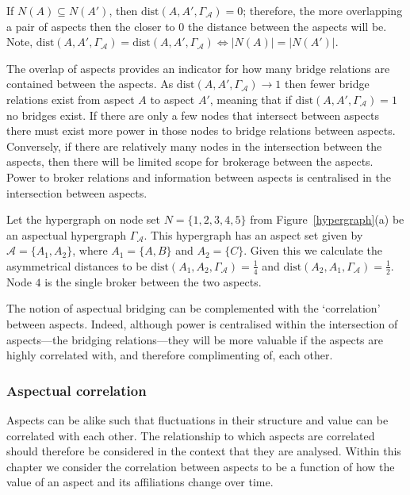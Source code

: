 If $N(A) \subseteq N(A')$, then $\mbox{dist}(A, A', \Gamma_{\mathcal{A}}) = 0$; therefore, the more overlapping a pair of aspects then the closer to $0$ the distance between the aspects will be. Note, $\mbox{dist}(A, A',\Gamma_{\mathcal{A}}) = \mbox{dist}(A, A',\Gamma_{\mathcal{A}}) \iff | N(A) | = | N(A') |$.

The overlap of aspects provides an indicator for how many bridge relations are contained between the aspects. As $\mbox{dist}(A, A',\Gamma_{\mathcal{A}}) \rightarrow 1$ then fewer bridge relations exist from aspect $A$ to aspect $A'$, meaning that if $\mbox{dist}(A, A',\Gamma_{\mathcal{A}}) = 1$ no bridges exist. If there are only a few nodes that intersect between aspects there must exist more power in those nodes to bridge relations between aspects. Conversely, if there are relatively many nodes in the intersection between the aspects, then there will be limited scope for brokerage between the aspects. Power to broker relations and information between aspects is centralised in the intersection between aspects.

\begin{example} \label{ex:dist}
Let the hypergraph on node set $N = \{1,2,3,4,5\}$ from Figure~\ref{hypergraph}(a) be an aspectual hypergraph $\Gamma_{\mathcal{A}}$. This hypergraph has an aspect set given by $\mathcal{A} = \{A_{1}, A_{2} \}$, where $A_{1} = \{A,B\}$ and $A_{2} = \{C\}$. Given this we calculate the asymmetrical distances to be $\mbox{dist}(A_{1}, A_{2}, \Gamma_{\mathcal{A}}) = \frac{1}{4}$ and $\mbox{dist}(A_{2}, A_{1}, \Gamma_{\mathcal{A}}) = \frac{1}{2}$. Node $4$ is the single broker between the two aspects.
\end{example}

The notion of aspectual bridging can be complemented with the `correlation' between aspects. Indeed, although power is centralised within the intersection of aspects---the bridging relations---they will be more valuable if the aspects are highly correlated with, and therefore complimenting of, each other.

\subsubsection*{Aspectual correlation}

Aspects can be alike such that fluctuations in their structure and value can be correlated with each other. The relationship to which aspects are correlated should therefore be considered in the context that they are analysed. Within this chapter we consider the correlation between aspects to be a function of how the value of an aspect and its affiliations change over time.

